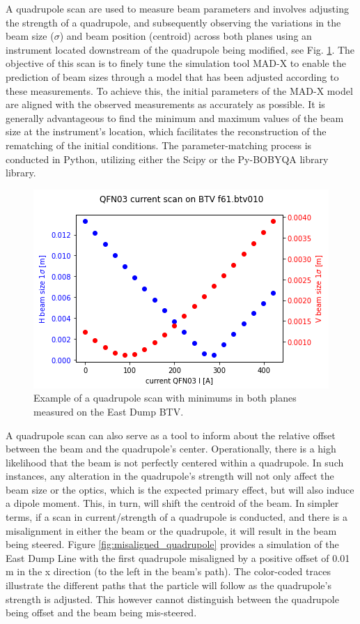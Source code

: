 A quadrupole scan are used to measure beam parameters and involves adjusting the strength of a quadrupole, and subsequently observing the variations in the beam size ($\sigma$) and beam position (centroid) across both planes using an instrument located downstream of the quadrupole being modified, see Fig. \ref{fig:quad_scan_example}. The objective of this scan is to finely tune the simulation tool MAD-X \cite{noauthor_mad_nodate} to enable the prediction of beam sizes through a model that has been adjusted according to these measurements. To achieve this, the initial parameters of the MAD-X model are aligned with the observed measurements as accurately as possible. It is generally advantageous to find the minimum and maximum values of the beam size at the instrument's location, which facilitates the reconstruction of the rematching of the initial conditions. The parameter-matching process is conducted in Python, utilizing either the Scipy or the Py-BOBYQA library\cite{cartis_improving_2019, cartis_escaping_2022} library.

\begin{figure}[htbp]
\centering
\includegraphics[width=0.5\linewidth]{03_Empirical_Measurements/images/quadrupole_scan_east_dump.png}
\caption{Example of a quadrupole scan with minimums in both planes measured on the East Dump BTV.}
\label{fig:quad_scan_example}
\end{figure}

A quadrupole scan can also serve as a tool to inform about the relative offset between the beam and the quadrupole's center. Operationally, there is a high likelihood that the beam is not perfectly centered within a quadrupole. In such instances, any alteration in the quadrupole's strength will not only affect the beam size or the optics, which is the expected primary effect, but will also induce a dipole moment. This, in turn, will shift the centroid of the beam. In simpler terms, if a scan in current/strength of a quadrupole is conducted, and there is a misalignment in either the beam or the quadrupole, it will result in the beam being steered. Figure \ref{fig:misaligned_quadrupole} provides a simulation of the East Dump Line with the first quadrupole misaligned by a positive offset of 0.01 m in the x direction (to the left in the beam's path). The color-coded traces illustrate the different paths that the particle will follow as the quadrupole's strength is adjusted. This however cannot distinguish between the quadrupole being offset and the beam being mis-steered.
\\

